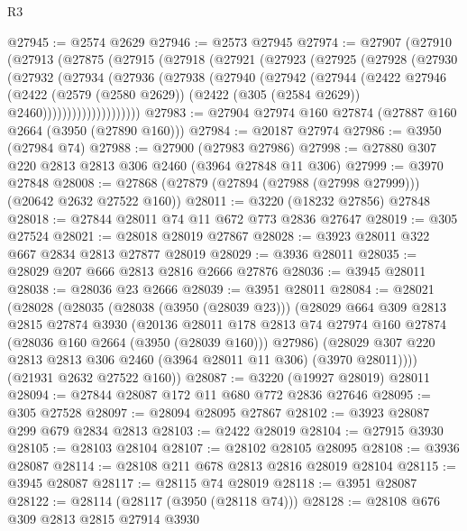 \begin{lexlean}{R3}
\begin{coremodule}
@27945 := @2574 @2629
@27946 := @2573 @27945
@27974 := @27907
    (@27910
      (@27913
        (@27875
          (@27915
            (@27918
              (@27921
                (@27923
                  (@27925
                    (@27928
                      (@27930
                        (@27932
                          (@27934
                            (@27936
                              (@27938
                                (@27940
                                  (@27942
                                    (@27944
                                      (@2422
                                        @27946
                                        (@2422
                                          (@2579 (@2580 @2629))
                                          (@2422 (@305 (@2584 @2629)) @2460))))))))))))))))))))
@27983 := @27904 @27974 @160 @27874 (@27887 @160 @2664 (@3950 (@27890 @160)))
@27984 := @20187 @27974
@27986 := @3950 (@27984 @74)
@27988 := @27900 (@27983 @27986)
@27998 := @27880 @307 @220 @2813 @2813 @306 @2460 (@3964 @27848 @11 @306)
@27999 := @3970 @27848
@28008 := @27868 (@27879 (@27894 (@27988 (@27998 @27999))) (@20642 @2632 @27522 @160))
@28011 := @3220 (@18232 @27856) @27848
@28018 := @27844 @28011 @74 @11 @672 @773 @2836 @27647
@28019 := @305 @27524
@28021 := @28018 @28019 @27867
@28028 := @3923 @28011 @322 @667 @2834 @2813 @27877 @28019
@28029 := @3936 @28011
@28035 := @28029 @207 @666 @2813 @2816 @2666 @27876
@28036 := @3945 @28011
@28038 := @28036 @23 @2666
@28039 := @3951 @28011
@28084 := @28021
    (@28028
      (@28035
        (@28038 (@3950 (@28039 @23)))
        (@28029
          @664
          @309
          @2813
          @2815
          @27874
          @3930
          (@20136
            @28011
            @178
            @2813
            @74
            @27974
            @160
            @27874
            (@28036 @160 @2664 (@3950 (@28039 @160)))
            @27986)
          (@28029 @307 @220 @2813 @2813 @306 @2460 (@3964 @28011 @11 @306) (@3970 @28011))))
      (@21931 @2632 @27522 @160))
@28087 := @3220 (@19927 @28019) @28011
@28094 := @27844 @28087 @172 @11 @680 @772 @2836 @27646
@28095 := @305 @27528
@28097 := @28094 @28095 @27867
@28102 := @3923 @28087 @299 @679 @2834 @2813
@28103 := @2422 @28019
@28104 := @27915 @3930
@28105 := @28103 @28104
@28107 := @28102 @28105 @28095
@28108 := @3936 @28087
@28114 := @28108 @211 @678 @2813 @2816 @28019 @28104
@28115 := @3945 @28087
@28117 := @28115 @74 @28019
@28118 := @3951 @28087
@28122 := @28114 (@28117 (@3950 (@28118 @74)))
@28128 := @28108 @676 @309 @2813 @2815 @27914 @3930

\end{coremodule}
\end{lexlean}
